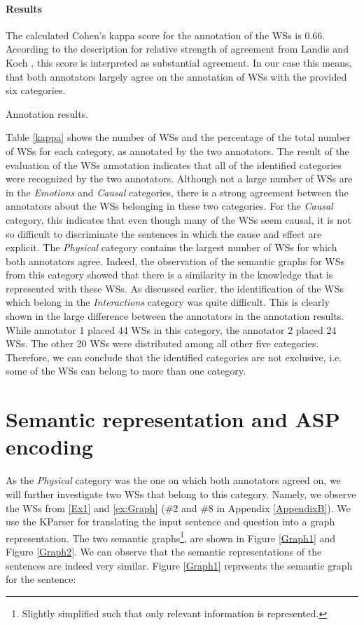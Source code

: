 \paragraph{Results}
The calculated Cohen's kappa score for the annotation of the WSs is 0.66. According to the description for relative strength of agreement from Landis and Koch \cite{articleM}, this score is interpreted as substantial agreement. In our case this means, that both annotators largely agree on the annotation of WSs with the provided six categories.

\begin{table}[h!]
	\centering
	
	\caption{{\label{kappa}}Annotation results.}
\end{table}

Table \ref{kappa} shows the number of WSs  and the percentage of the total number of WSs for each category, as annotated by the two annotators. The result of the evaluation of the WSs annotation indicates that all of the identified categories were recognized by the two annotators. Although not a large number of WSs are in the \textit{Emotions} and \textit{Causal} categories, there is a strong agreement between the annotators about the WSs belonging in these two categories. For the \textit{Causal} category, this indicates that even though many of the WSs seem causal, it is not so difficult to discriminate the sentences in which the cause and effect are explicit. The \textit{Physical} category contains the largest number of WSs for which both annotators agree. Indeed, the observation of the semantic graphs for WSs from this category showed that there is a similarity in the knowledge that is represented with these WSs. As discussed earlier, the identification of the WSs which belong in the \textit{Interactions} category was quite difficult. This is clearly shown in the large difference between the annotators in the annotation results. While annotator 1 placed 44 WSs in this category, the annotator 2 placed 24 WSs.
The other 20 WSs were distributed among all other five categories. Therefore, we can conclude that the identified categories are not exclusive, i.e. some of the WSs can belong to more than one category. 



\section{Semantic representation and ASP encoding}
As the \textit{Physical} category was the one on which both annotators agreed on, we will further investigate two WSs that belong to this category. Namely, we observe the WSs from \ref{Ex1} and \ref{ex:Graph} (\#2 and \#8 in Appendix \ref{AppendixB}). 
We use the KParser for translating the input sentence and question into a graph representation.
The two semantic graphs\footnote{Slightly simplified such that only relevant information is represented.}, are shown in Figure \ref{Graph1} and Figure \ref{Graph2}. We can observe that the semantic representations of the sentences are indeed very similar. 
Figure \ref{Graph1} represents the semantic graph for the sentence:

